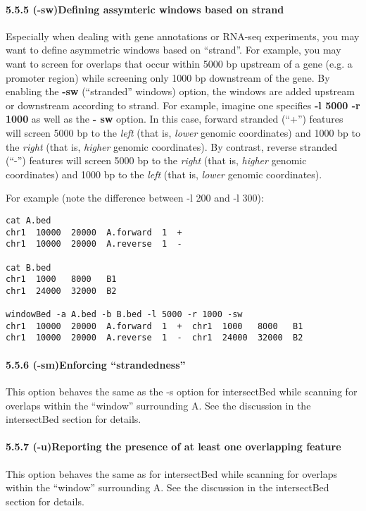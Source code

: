 \documentclass[letterpaper,10pt,english]{sphinxmanual}
\begin{document}
\paragraph{5.5.5 (-sw)Defining assymteric windows based on strand}
\label{content/windowBed:sw-defining-assymteric-windows-based-on-strand}
Especially when dealing with gene annotations or RNA-seq experiments, you may want to define
asymmetric windows based on ``strand''. For example, you may want to screen for overlaps that occur
within 5000 bp upstream of a gene (e.g. a promoter region) while screening only 1000 bp downstream of
the gene. By enabling the \textbf{-sw} (``stranded'' windows) option, the windows are added upstream or
downstream according to strand. For example, imagine one specifies \textbf{-l 5000 -r 1000} as well as the \textbf{-
sw} option. In this case, forward stranded (``+'') features will screen 5000 bp to the \emph{left} (that is, \emph{lower}
genomic coordinates) and 1000 bp to the \emph{right} (that is, \emph{higher} genomic coordinates). By contrast,
reverse stranded (``-'') features will screen 5000 bp to the \emph{right} (that is, \emph{higher} genomic coordinates) and
1000 bp to the \emph{left} (that is, \emph{lower} genomic coordinates).

For example (note the difference between -l 200 and -l 300):

\begin{Verbatim}[commandchars=\\\{\}]
cat A.bed
chr1  10000  20000  A.forward  1  +
chr1  10000  20000  A.reverse  1  -

cat B.bed
chr1  1000   8000   B1
chr1  24000  32000  B2

windowBed -a A.bed -b B.bed -l 5000 -r 1000 -sw
chr1  10000  20000  A.forward  1  +  chr1  1000   8000   B1
chr1  10000  20000  A.reverse  1  -  chr1  24000  32000  B2
\end{Verbatim}


\paragraph{5.5.6 (-sm)Enforcing ``strandedness''}
\label{content/windowBed:sm-enforcing-strandedness}
This option behaves the same as the -s option for intersectBed while scanning for overlaps within the
``window'' surrounding A. See the discussion in the intersectBed section for details.


\paragraph{5.5.7 (-u)Reporting the presence of at least one overlapping feature}
\label{content/windowBed:u-reporting-the-presence-of-at-least-one-overlapping-feature}
This option behaves the same as for intersectBed while scanning for overlaps within the ``window''
surrounding A. See the discussion in the intersectBed section for details.
\end{document}
